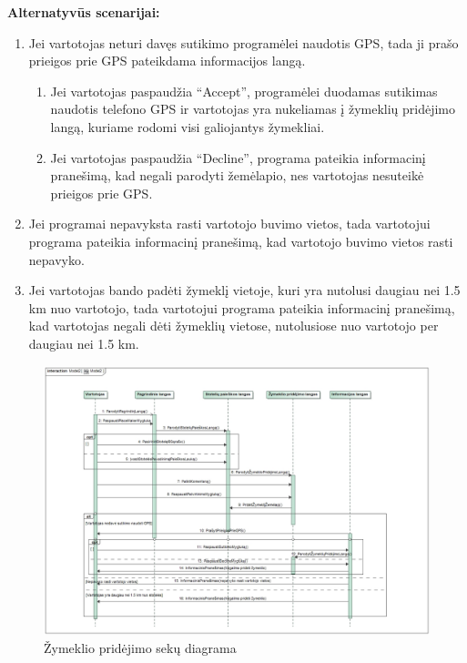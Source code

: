 \documentclass{VUMIFPSkursinis}
\begin{document}
	\textbf{Alternatyvūs scenarijai:}
	\begin{enumerate}[itemsep=-2mm]
		\item Jei vartotojas neturi davęs sutikimo programėlei naudotis GPS, tada ji prašo prieigos prie GPS pateikdama informacijos langą. 
		\begin{enumerate}[itemsep=-2mm]
			\item Jei vartotojas paspaudžia “Accept”, programėlei duodamas sutikimas naudotis telefono GPS ir vartotojas yra nukeliamas į žymeklių pridėjimo langą, kuriame rodomi visi galiojantys žymekliai.
			\item Jei vartotojas paspaudžia “Decline”, programa pateikia informacinį pranešimą, kad negali parodyti žemėlapio, nes vartotojas nesuteikė prieigos prie GPS.
		\end{enumerate} 
		\item Jei programai nepavyksta rasti vartotojo buvimo vietos, tada vartotojui programa pateikia informacinį pranešimą, kad vartotojo buvimo vietos rasti nepavyko.
		\item Jei vartotojas bando padėti žymeklį vietoje, kuri yra nutolusi daugiau nei 1.5 km nuo vartotojo, tada vartotojui programa pateikia informacinį pranešimą, kad vartotojas negali dėti žymeklių vietose, nutolusiose nuo vartotojo per daugiau nei 1.5 km.
	\end{enumerate} 
		\begin{figure}[H]
				\centering
				\includegraphics[scale=0.4]{img/AddMarkerSequence}
				\caption{Žymeklio pridėjimo sekų diagrama}
				\label{img:Žymeklio pridėjimo langas RD}
			\end{figure}
\end{document}
